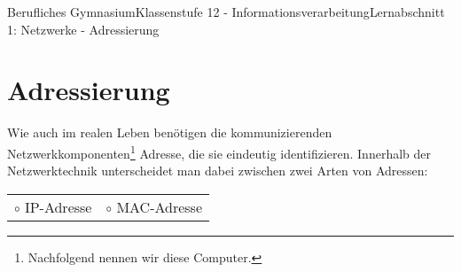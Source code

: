 \documentclass[11pt,oneside,openany,headings=optiontotoc,11pt,numbers=noenddot]{article}
\begin{document}
	\begin{worksheet}{Berufliches Gymnasium}{Klassenstufe 12 - Informationsverarbeitung}{Lernabschnitt 1: Netzwerke - Adressierung}
		\section{Adressierung}
		Wie auch im realen Leben benötigen die kommunizierenden Netzwerkkomponenten\footnote{Nachfolgend nennen wir diese Computer.} Adresse, die sie eindeutig identifizieren. Innerhalb der Netzwerktechnik unterscheidet man dabei zwischen zwei Arten von Adressen:\\
		\par\noindent
		\begin{tabularx}{\textwidth}{MM}
			\(\circ\) IP-Adresse & \(\circ\) MAC-Adresse
		\end{tabularx}

\end{worksheet}
\end{document}

